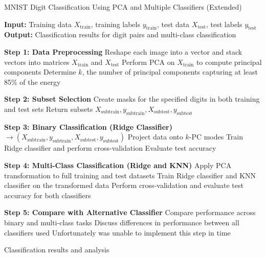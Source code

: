 \documentclass[11pt]{amsart}
\begin{document}
\begin{algorithm}[H]
    \caption{MNIST Digit Classification Using PCA and Multiple Classifiers (Extended)}
    \label{alg:mnist_classification_extended}
    \begin{algorithmic}[1]
    \State \textbf{Input:} Training data $X_{\text{train}}$, training labels $y_{\text{train}}$, test data $X_{\text{test}}$, test labels $y_{\text{test}}$
    \State \textbf{Output:} Classification results for digit pairs and multi-class classification
    
    \State \textbf{Step 1: Data Preprocessing}
    \State Reshape each image into a vector and stack vectors into matrices $X_{\text{train}}$ and $X_{\text{test}}$
    \State Perform PCA on $X_{\text{train}}$ to compute principal components
    \State Determine $k$, the number of principal components capturing at least 85\% of the energy
    
    \State \textbf{Step 2: Subset Selection}
        \State Create masks for the specified digits in both training and test sets
        \State Return subsets $X_{\text{subtrain}}, y_{\text{subtrain}}, X_{\text{subtest}}, y_{\text{subtest}}$
    \EndFunction
    
    \State \textbf{Step 3: Binary Classification (Ridge Classifier)}
        \State {} $\rightarrow (X_{\text{subtrain}}, y_{\text{subtrain}}, X_{\text{subtest}}, y_{\text{subtest}})$
        \State Project data onto $k$-PC modes
        \State Train Ridge classifier and perform cross-validation
        \State Evaluate test accuracy
    \EndFor
    
    \State \textbf{Step 4: Multi-Class Classification (Ridge and KNN)}
    \State Apply PCA transformation to full training and test datasets
    \State Train Ridge classifier and KNN classifier on the transformed data
    \State Perform cross-validation and evaluate test accuracy for both classifiers

    \State \textbf{Step 5: Compare with Alternative Classifier}
    \State Compare performance across binary and multi-class tasks
    \State Discuss differences in performance between all classifiers used
    \State Unfortunately was unable to implement this step in time
    
    \State \Return Classification results and analysis
    \end{algorithmic}
\end{algorithm}
\end{document}
